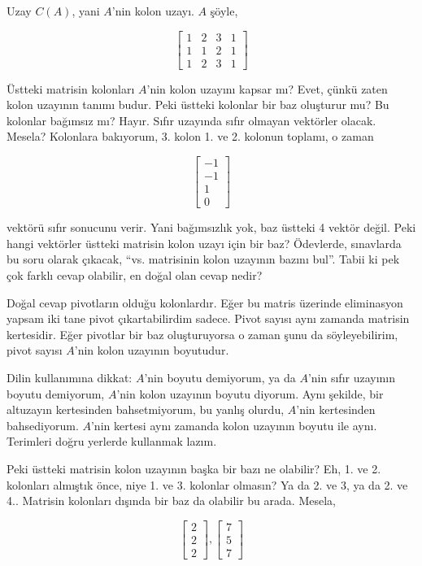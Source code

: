 \documentclass[12pt,fleqn]{article}\usepackage{../../common}
\begin{document}
Uzay $C(A)$, yani $A$'nin kolon uzayı. $A$ şöyle,

$$ 
\left[\begin{array}{rrrr}
1 & 2 & 3 & 1 \\
1 & 1 & 2 & 1 \\
1 & 2 & 3 & 1
\end{array}\right]
 $$

Üstteki matrisin kolonları $A$'nin kolon uzayını kapsar mı? Evet, çünkü
zaten kolon uzayının tanımı budur. Peki üstteki kolonlar bir baz oluşturur
mu? Bu kolonlar bağımsız mı? Hayır. Sıfır uzayında sıfır olmayan vektörler
olacak. Mesela? Kolonlara bakıyorum, 3. kolon 1. ve 2. kolonun toplamı, o
zaman 

$$ 
\left[\begin{array}{r}
-1 \\ -1 \\ 1 \\ 0
\end{array}\right]
 $$

vektörü sıfır sonucunu verir. Yani bağımsızlık yok, baz üstteki 4 vektör
değil. Peki hangi vektörler üstteki matrisin kolon uzayı için bir baz?
Ödevlerde, sınavlarda bu soru olarak çıkacak, ``vs. matrisinin kolon uzayının
bazını bul''. Tabii ki pek çok farklı cevap olabilir, en doğal olan cevap
nedir? 

Doğal cevap pivotların olduğu kolonlardır. Eğer bu matris üzerinde
eliminasyon yapsam iki tane pivot çıkartabilirdim sadece. Pivot sayısı aynı
zamanda matrisin kertesidir. Eğer pivotlar bir baz oluşturuyorsa o zaman
şunu da söyleyebilirim, pivot sayısı $A$'nin kolon uzayının boyutudur. 

Dilin kullanımına dikkat: $A$'nin boyutu demiyorum, ya da $A$'nin sıfır
uzayının boyutu demiyorum, $A$'nin kolon uzayının boyutu diyorum. Aynı
şekilde, bir altuzayın kertesinden bahsetmiyorum, bu yanlış olurdu, $A$'nin
kertesinden bahsediyorum. $A$'nin kertesi aynı zamanda kolon uzayının
boyutu ile aynı. Terimleri doğru yerlerde kullanmak lazım. 

Peki üstteki matrisin kolon uzayının başka bir bazı ne olabilir? Eh, 1. ve
2. kolonları almıştık önce, niye 1. ve 3. kolonlar olmasın? Ya da 2. ve 3,
ya da 2. ve 4.. Matrisin kolonları dışında bir baz da olabilir bu
arada. Mesela, 

$$ 
\left[\begin{array}{r}
2 \\ 2 \\ 2 
\end{array}\right],
\left[\begin{array}{r}
7 \\ 5 \\ 7 
\end{array}\right]
 $$
\end{document}
